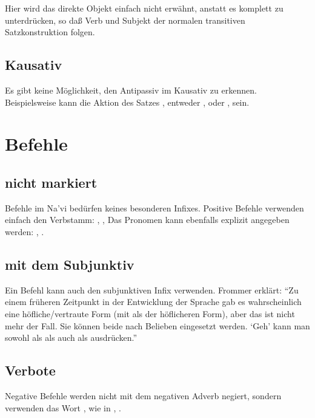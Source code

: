 \noindent Hier wird das direkte Objekt einfach nicht erw\"ahnt, anstatt es
komplett zu unterdr\"ucken, so da\ss{} Verb und Subjekt der normalen transitiven
Satzkonstruktion folgen.

\subsection{Kausativ} Es gibt keine M\"oglichkeit, den Antipassiv im Kausativ zu
erkennen. Beispielsweise kann die Aktion des Satzes ,
 entweder ,  oder ,  sein.


\section{Befehle}
\subsection{nicht markiert} Befehle im Na’vi bed\"urfen keines besonderen Infixes.
Positive Befehle verwenden einfach den Verbstamm:  , 
,  Das Pronomen kann ebenfalls explizit
angegeben werden: , .

\subsection{mit dem Subjunktiv} Ein Befehl kann auch den subjunktiven Infix 
verwenden. Frommer erkl\"art: "`Zu einem fr\"uheren Zeitpunkt in der Entwicklung der
Sprache gab es wahrscheinlich eine h\"ofliche/vertraute Form (mit  als
der h\"oflicheren Form), aber das ist nicht mehr der Fall. Sie k\"onnen beide
nach Belieben eingesetzt werden. `Geh' kann man sowohl als  als
auch als  ausdr\"ucken."'

\subsection{Verbote} Negative Befehle werden nicht mit dem negativen Adverb 
negiert, sondern verwenden das Wort , wie in ,
.
\label{syntax:prohibitions}

